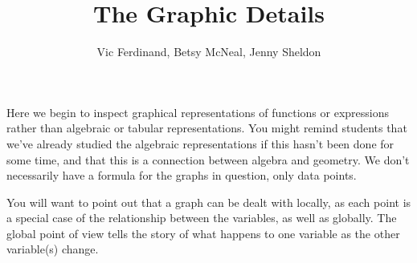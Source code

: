 \documentclass{ximera}
\title{The Graphic Details}
\author{Vic Ferdinand, Betsy McNeal, Jenny Sheldon}
\begin{document}
\begin{abstract}\end{abstract}
\maketitle

\begin{instructorIntro}
Here we begin to inspect graphical representations of functions or expressions rather than algebraic or tabular representations.  You might remind students that we've already studied the algebraic representations if this hasn't been done for some time, and that this is a connection between algebra and geometry.  We don't necessarily have a formula for the graphs in question, only data points.  

You will want to point out that a graph can be dealt with locally, as each point is a special case of the relationship between the variables, as well as globally.  The global point of view tells the story of what happens to one variable as the other variable(s) change.


\vskip 3.5in
\end{instructorIntro}
\end{document}
